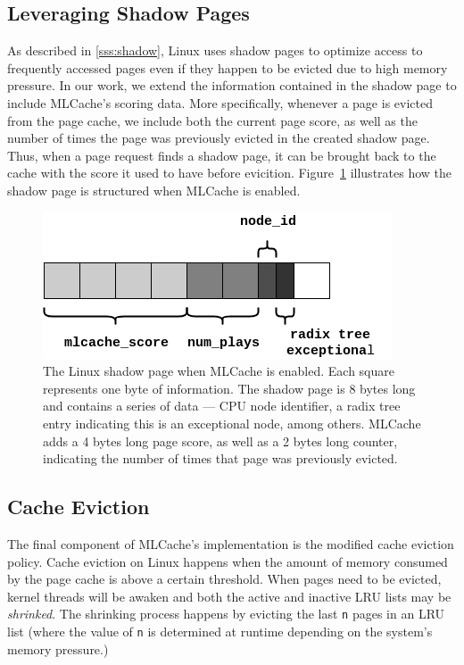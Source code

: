 \subsection{Leveraging Shadow Pages}

As described in \ref{sss:shadow}, Linux uses shadow pages to optimize access to frequently accessed
pages even if they happen to be evicted due to high memory pressure. In our work, we extend the information
contained in the shadow page to include MLCache's scoring data. More specifically, whenever a page
is evicted from the page cache, we include both the current page score, as well as the number of times
the page was previously evicted in the created shadow page. Thus, when a page request finds a shadow
page, it can be brought back to the cache with the score it used to have before evicition. Figure~\ref{fig:shadow}
illustrates how the shadow page is structured when MLCache is enabled.

\begin{figure}[h]
  \includegraphics[scale=0.4]{img/ShadowPage.png}
  \caption{The Linux shadow page when MLCache is enabled. Each square
  represents one byte of information.  The shadow page is 8 bytes long and
  contains a series of data --- CPU node identifier, a radix tree entry indicating
  this is an exceptional node, among others. MLCache adds a 4 bytes long page
  score, as well as a 2 bytes long counter, indicating the number of times that
  page was previously evicted.}
  \label{fig:shadow}
\end{figure}

\subsection{Cache Eviction}

The final component of MLCache's implementation is the modified cache eviction policy. Cache eviction
on Linux happens when the amount of memory consumed by the page cache is above a certain threshold.
When pages need to be evicted, kernel threads will be awaken and both the active and inactive
LRU lists may be \emph{shrinked}. The shrinking process happens by evicting the last \texttt{n}
pages in an LRU list (where the value of \texttt{n} is determined at runtime depending on the
system's memory pressure.)

